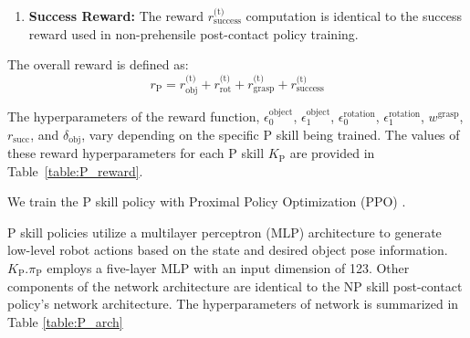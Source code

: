 \begin{itemize}
\begin{enumerate}
    \item \textbf{Success Reward:}
    The reward $r^\text{(t)}_\text{success}$ computation is identical to the success reward used in non-prehensile post-contact policy training. %

    
    \end{enumerate}

    The overall reward is defined as:
    \[
    r_{\text{P}} = r^\text{(t)}_{\text{obj}} + r^\text{(t)}_{\text{rot}} + r^\text{(t)}_{\text{grasp}} + r^\text{(t)}_{\text{success}}
    \]

    The hyperparameters of the reward function, $\epsilon_0^{\text{object}}$, $\epsilon_1^{\text{object}}$, $\epsilon_0^{\text{rotation}}$, $\epsilon_1^{\text{rotation}}$, $w^{\text{grasp}}$, $r_{\text{succ}}$, and $\delta_\text{obj}$, vary depending on the specific P skill being trained. The values of these reward hyperparameters for each P skill \( K_\text{P} \) are provided in Table~\ref{table:P_reward}.

\end{itemize}



We train the P skill policy with Proximal Policy Optimization (PPO) \cite{schulman2017proximal}.

\medskip
P skill policies utilize a multilayer perceptron (MLP) architecture to generate low-level robot actions based on the state and desired object pose information. \( K_{\text{P}}.\pi_{\text{P}} \) employs a five-layer MLP with an input dimension of 123. Other components of the network architecture are identical to the NP skill post-contact policy's network architecture. The hyperparameters of network is summarized in Table \ref{table:P_arch}
